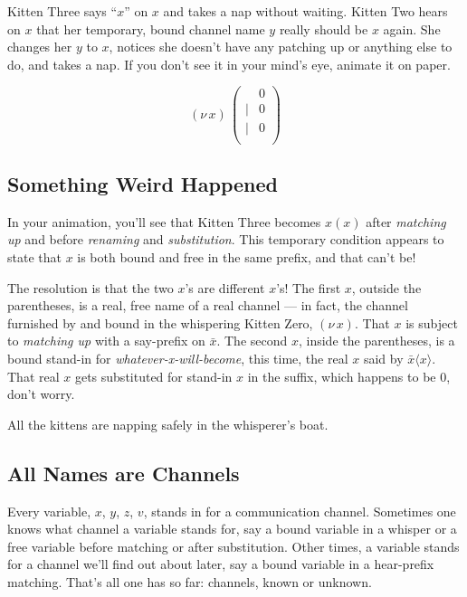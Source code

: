 \documentclass[10pt,oneside,x11names]{article}
\newcommand\napping    [0]{0}
\newcommand\whispering [2]{(\nu\,#1)\,{#2}}
\theoremstyle{definition}
\theoremstyle{warning}
\begin{document}
Kitten Three says ``\(x\)'' on \(x\) and takes a nap without
waiting. Kitten Two hears on \(x\) that her temporary, bound
channel name \(y\) really should be \(x\) again. She changes her
\(y\) to \(x\), notices she doesn't have any patching up or
anything else to do, and takes a nap. If you don't see it in
your mind's eye, animate it on paper.

\begin{equation}
\whispering{x}{\left(
\begin{array}{clll}
 {}     & \napping   \\
 \vert  & {\napping} \\
 \vert  & {\napping} \\
\end{array}\right)}
\end{equation}

\subsection{Something Weird Happened}
\label{sec:org62eb3f6}

In your animation, you'll see that Kitten Three becomes \(x(x)\)
after \emph{matching up} and before \emph{renaming} and \emph{substitution}. This
temporary condition appears to state that \(x\) is both bound and
free in the same prefix, and that can't be!

The resolution is that the two \(x\)'s are different \(x\)'s! The
first \(x\), outside the parentheses, is a real, free name of a
real channel --- in fact, the channel furnished by and bound
in the whispering Kitten Zero, \((\nu\,x)\). That \(x\) is subject
to \emph{matching up} with a say-prefix on \(\bar{x}\). The second
\(x\), inside the parentheses, is a bound stand-in for
\emph{whatever-x-will-become}, this time, the real
\(x\) said by  \(\bar{x}\langle{x}\rangle\). That real \(x\) gets
substituted for stand-in \(x\) in the suffix, which happens to
be \(0\), don't worry.

All the kittens are napping safely in the whisperer's boat.

\subsection{All Names are Channels}
\label{sec:org6512689}

Every variable, \(x\), \(y\), \(z\), \(v\), stands in for a
communication channel. Sometimes one knows what channel a
variable stands for, say a bound variable in a whisper or a
free variable before matching or after substitution. Other
times, a variable stands for a channel we'll find out about
later, say a bound variable in a hear-prefix matching. That's
all one has so far: channels, known or unknown.
\end{document}
